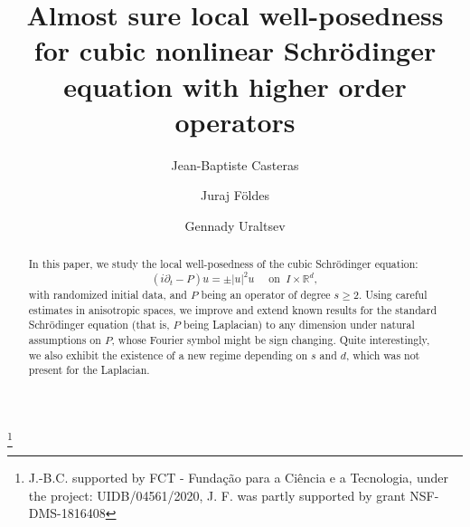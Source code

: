 \documentclass[10pt,leqno]{amsart}
\newcommand{\R}{\mathbb{R}} %
\numberwithin{equation}{section}
\begin{document}
\title[Local well-posedness for cubic NLS]{Almost sure local well-posedness for cubic nonlinear Schr\" odinger equation with higher order operators}
\author[Jean-Baptiste Casteras]{Jean-Baptiste Casteras}
\address{CMAFcIO, Faculdade de Ci\^encias da Universidade de Lisboa, Edificio C6, Piso 1, Campo Grande 1749-016 Lisboa, Portugal}
\author[Juraj F\" oldes]{Juraj F\" oldes}
\address{Dept. of Mathematics, University of Virginia, 322 Kerchof Hall, Charlottesville, VA 22904-4137}
\author[Gennady Uraltsev]{Gennady Uraltsev}
\address{Dept. of Mathematics, University of Virginia, Kerchof Hall, Charlottesville, VA 22904-4137}
\thanks{J.-B.C. supported by FCT - Funda\c c\~ao para a Ci\^encia e a Tecnologia, under the project: UIDB/04561/2020, J. F. was partly supported by grant NSF-DMS-1816408}


\begin{abstract}
In this paper, we study the local well-posedness of the cubic  Schr\" odinger equation:
$$ (i\partial_t - P) u = \pm |u|^2 u\quad \textrm{ on }\ I\times \R^d ,$$
with randomized initial data, and $P$ being an operator of degree $s \geq 2$. Using careful estimates in anisotropic spaces, we improve and extend known results for the standard Schr\" odinger equation 
(that is, $P$ being  Laplacian) to any dimension under natural assumptions on $P$, whose Fourier symbol might be sign changing. 
Quite interestingly, we  also exhibit the existence of a new regime depending on $s$ and $d$, which was not present for the Laplacian. 

\end{abstract}

\maketitle
\end{document}
